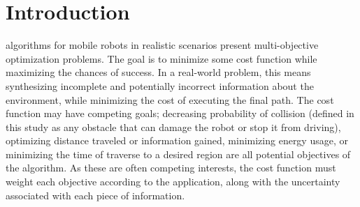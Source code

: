 \documentclass[journal]{IEEEtran}
\newcounter{col}
\begin{document}

\IEEEpeerreviewmaketitle



\section{Introduction}
 algorithms for mobile robots in realistic scenarios present multi-objective optimization problems. 
The goal is to minimize some cost function while maximizing the chances of success. 
In a real-world problem, this means synthesizing incomplete and potentially incorrect information about the environment, while minimizing the cost of executing the final path. 
The cost function may have competing goals; decreasing probability of collision (defined in this study as any obstacle that can damage the robot or stop it from driving), optimizing distance traveled or information gained, minimizing energy usage, or minimizing the time of traverse to a desired region are all potential objectives of the algorithm.
As these are often competing interests, the cost function must weight each objective according to the application, along with the uncertainty associated with each piece of information. 
\end{document}

